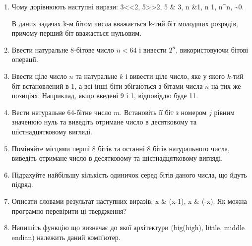 \documentclass[]{article}
\begin{document}
\begin{enumerate}
\item
Чому дорівнюють наступні вирази: 3\textless{}\textless{}2,
5\textgreater{}\textgreater{}2, 5 \& 3, n \&1, n \textbar{} 1, n\^{}n,
\textasciitilde{}0.

В даних задачах k-м бітом числа вважається k-тий біт молодших розрядів,
причому перший біт вважається нульовим.

\item
  Ввести натуральне 8-бітове число $n<64$ і вивести $2^{n}$, використовуючи бітові операції.
\item
  Ввести ціле число $n$ та натуральне $k$ і вивести ціле число, яке у якого
  $k$-тий біт встановлений в 1, а всі інші біти збігаються з бітами числа $n$
  на тих же позиціях. Наприклад, якщо введені 9 і 1, відповіддю буде 11.
\item
  Вести натуральне 64-бітне число $m$. Встановіть її біт
  з номером $j$ рівним значенюю нуль та виведіть отримане число в десятковому та
  шістнадцятковому вигляді.
\item
  Поміняйте місцями перші 8 бітів та останні 8 бітів натурального числа,
  виведіть отримане число в десятковому та шістнадцятковому вигляді.
\item
  Підрахуйте найбільшу кількість одиничок серед бітів даного числа, що
  йдуть підряд.
\item
  Описати словами результат наступних виразів: x \& (x-1), x \& (-x). 
Як можна програмно перевірити ці твердження?
\item
  Напишіть функцію що визначає до якої архітектури (big(high), little, middle
  endian) належить даний комп'ютер.


\end{enumerate}
\end{document}
